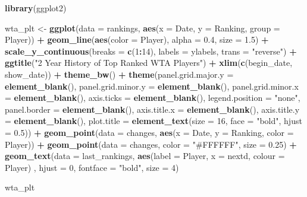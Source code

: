 \documentclass[]{book}
\newenvironment{Shaded}{\begin{snugshade}}{\end{snugshade}}
\newcommand{\DataTypeTok}[1]{\textcolor[rgb]{0.13,0.29,0.53}{#1}}
\newcommand{\DecValTok}[1]{\textcolor[rgb]{0.00,0.00,0.81}{#1}}
\newcommand{\FloatTok}[1]{\textcolor[rgb]{0.00,0.00,0.81}{#1}}
\newcommand{\KeywordTok}[1]{\textcolor[rgb]{0.13,0.29,0.53}{\textbf{#1}}}
\newcommand{\NormalTok}[1]{#1}
\newcommand{\OperatorTok}[1]{\textcolor[rgb]{0.81,0.36,0.00}{\textbf{#1}}}
\newcommand{\StringTok}[1]{\textcolor[rgb]{0.31,0.60,0.02}{#1}}
\begin{document}
\begin{Shaded}
\begin{Highlighting}[]
\KeywordTok{library}\NormalTok{(ggplot2)}

\NormalTok{wta_plt <-}\StringTok{ }\KeywordTok{ggplot}\NormalTok{(}\DataTypeTok{data =}\NormalTok{ rankings, }\KeywordTok{aes}\NormalTok{(}\DataTypeTok{x =}\NormalTok{ Date, }\DataTypeTok{y =}\NormalTok{ Ranking, }\DataTypeTok{group =}\NormalTok{ Player)) }\OperatorTok{+}\StringTok{ }
\StringTok{  }\KeywordTok{geom_line}\NormalTok{(}\KeywordTok{aes}\NormalTok{(}\DataTypeTok{color =}\NormalTok{ Player), }\DataTypeTok{alpha =} \FloatTok{0.4}\NormalTok{, }\DataTypeTok{size =} \FloatTok{1.5}\NormalTok{) }\OperatorTok{+}
\StringTok{  }\KeywordTok{scale_y_continuous}\NormalTok{(}\DataTypeTok{breaks =} \KeywordTok{c}\NormalTok{(}\DecValTok{1}\OperatorTok{:}\DecValTok{14}\NormalTok{), }\DataTypeTok{labels =}\NormalTok{ ylabels, }\DataTypeTok{trans =} \StringTok{"reverse"}\NormalTok{) }\OperatorTok{+}\StringTok{ }
\StringTok{  }\KeywordTok{ggtitle}\NormalTok{(}\StringTok{"2 Year History of Top Ranked WTA Players"}\NormalTok{) }\OperatorTok{+}\StringTok{ }
\StringTok{  }\KeywordTok{xlim}\NormalTok{(}\KeywordTok{c}\NormalTok{(begin_date, show_date)) }\OperatorTok{+}
\StringTok{  }\KeywordTok{theme_bw}\NormalTok{() }\OperatorTok{+}\StringTok{ }
\StringTok{  }\KeywordTok{theme}\NormalTok{(}\DataTypeTok{panel.grid.major.y =} \KeywordTok{element_blank}\NormalTok{(), }\DataTypeTok{panel.grid.minor.y =} \KeywordTok{element_blank}\NormalTok{(),}
        \DataTypeTok{panel.grid.minor.x =} \KeywordTok{element_blank}\NormalTok{(), }\DataTypeTok{axis.ticks =} \KeywordTok{element_blank}\NormalTok{(), }
        \DataTypeTok{legend.position =} \StringTok{"none"}\NormalTok{, }\DataTypeTok{panel.border =} \KeywordTok{element_blank}\NormalTok{(),}
        \DataTypeTok{axis.title.x =} \KeywordTok{element_blank}\NormalTok{(), }\DataTypeTok{axis.title.y =} \KeywordTok{element_blank}\NormalTok{(),}
        \DataTypeTok{plot.title =} \KeywordTok{element_text}\NormalTok{(}\DataTypeTok{size =} \DecValTok{16}\NormalTok{, }\DataTypeTok{face =} \StringTok{"bold"}\NormalTok{, }\DataTypeTok{hjust =} \FloatTok{0.5}\NormalTok{)) }\OperatorTok{+}\StringTok{ }\KeywordTok{geom_point}\NormalTok{(}\DataTypeTok{data =}\NormalTok{ changes, }\KeywordTok{aes}\NormalTok{(}\DataTypeTok{x =}\NormalTok{ Date, }\DataTypeTok{y =}\NormalTok{ Ranking, }\DataTypeTok{color =}\NormalTok{ Player)) }\OperatorTok{+}
\StringTok{  }\KeywordTok{geom_point}\NormalTok{(}\DataTypeTok{data =}\NormalTok{ changes, }\DataTypeTok{color =} \StringTok{"#FFFFFF"}\NormalTok{, }\DataTypeTok{size =} \FloatTok{0.25}\NormalTok{) }\OperatorTok{+}\StringTok{ }\KeywordTok{geom_text}\NormalTok{(}\DataTypeTok{data =}\NormalTok{ last_rankings,}
            \KeywordTok{aes}\NormalTok{(}\DataTypeTok{label =}\NormalTok{ Player, }\DataTypeTok{x =}\NormalTok{ nextd,  }\DataTypeTok{colour =}\NormalTok{ Player) , }\DataTypeTok{hjust =} \DecValTok{0}\NormalTok{,}
            \DataTypeTok{fontface =} \StringTok{"bold"}\NormalTok{, }\DataTypeTok{size =} \DecValTok{4}\NormalTok{)}

\NormalTok{wta_plt}
\end{Highlighting}
\end{Shaded}
\end{document}
